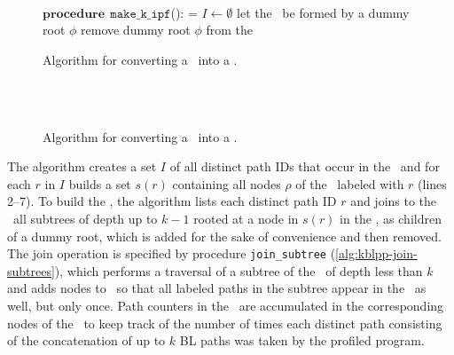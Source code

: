 \ifdefined\noauthorea
\begin{figure}[hb!]
\IncMargin{2em}
\begin{algorithm}[H]
\DontPrintSemicolon
\LinesNumbered
\SetAlgoNoLine
\SetNlSkip{1em}
\Indm\Indmm
\hrulefill\\
$\mathbf{procedure} \> \> \texttt{make\_k\_ipf}$():\;
\vspace{1mm}
\everypar={\nl}
\Indp\Indpp
$I\gets\emptyset$\;
let the \kipf\ be formed by a dummy root $\phi$\;
remove dummy root $\phi$ from the \kipf\;
\vspace{-2mm}
\Indm\Indmm
\nonl\hrulefill\vspace{1mm}\\
\DecMargin{3.5em}
\caption{\label{alg:kblpp-ksf-to-kipf} Algorithm for converting a \ksf\ into a \kipf.}
\IncMargin{1.5em}
\end{algorithm}
\end{figure}

\else
\begin{figure}[ht]
\caption{\label{alg:kblpp-ksf-to-kipf} Algorithm for converting a \ksf\ into a \kipf.}
\begin{small}
\begin{minipage}{0.9\textwidth}
\hrulefill\\
\algmissing\

\vspace{-1mm}
\hrulefill
\vspace{-2mm}
\end{minipage}
\end{small}
\end{figure}
\fi

\noindent The algorithm creates a set $I$ of all distinct path IDs that occur in the \ksf\ and for each $r$ in $I$ builds a set $s(r)$ containing all nodes $\rho$ of the \ksf\ labeled with $r$ (lines 2--7). To build the \kipf, the algorithm lists each distinct path ID $r$ and joins to the \kipf\ all subtrees of depth up to $k-1$ rooted at a node in $s(r)$ in the \ksf, as children of a dummy root, which is added for the sake of convenience and then removed. The join operation is specified by procedure {\tt join\_subtree} (\myalgorithm\ref{alg:kblpp-join-subtrees}), which performs a traversal of a subtree of the \ksf\ of depth less than $k$ and adds nodes to \kipf\ so that all labeled paths in the subtree appear in the \kipf\ as well, but only once. Path counters in the \ksf\ are accumulated in the corresponding nodes of the \kipf\ to keep track of the number of times each distinct path consisting of the concatenation of up to $k$ BL paths was taken by the profiled program.

